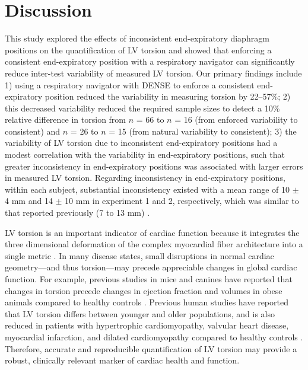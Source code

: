 \section{Discussion}
	This study explored the effects of inconsistent end-expiratory diaphragm positions on the quantification of LV torsion and showed that enforcing a consistent end-expiratory position with a respiratory navigator can significantly reduce inter-test variability of measured LV torsion. Our primary findings include 1) using a respiratory navigator with DENSE to enforce a consistent end-expiratory position reduced the variability in measuring torsion by 22–57\%; 2) this decreased variability reduced the required sample sizes to detect a 10\% relative difference in torsion from $n$ = 66 to $n$ = 16 (from enforced variability to consistent) and $n$ = 26 to $n$ = 15 (from natural variability to consistent); 3) the variability of LV torsion due to inconsistent end-expiratory positions had a modest correlation with the variability in end-expiratory positions, such that greater inconsistency in end-expiratory positions was associated with larger errors in measured LV torsion. Regarding inconsistency in end-expiratory positions, within each subject, substantial inconsistency existed with a mean range of 10 $\pm$ 4 mm and 14 $\pm$ 10 mm in experiment 1 and 2, respectively, which was similar to that reported previously (7 to 13 mm) \cite{Liu1993,Wang1995a,Taylor1997a,Holland1998c,Fischer2006a}.
	
	LV torsion is an important indicator of cardiac function because it integrates the three dimensional deformation of the complex myocardial fiber architecture into a single metric \cite{Russel2011b,Gotte2006a}. In many disease states, small disruptions in normal cardiac geometry---and thus torsion---may precede appreciable changes in global cardiac function. For example, previous studies in mice and canines have reported that changes in torsion precede changes in ejection fraction and volumes in obese animals compared to healthy controls \cite{Broussard2016a,Kramer2013c}. Previous human studies have reported that LV torsion differs between younger and older populations, and is also reduced in patients with hypertrophic cardiomyopathy, valvular heart disease, myocardial infarction, and dilated cardiomyopathy compared to healthy controls \cite{Gotte2006a,Phan2009a,Oxenham2003a,Young1994a,Setser2003a,Garot2002a}. Therefore, accurate and reproducible quantification of LV torsion may provide a robust, clinically relevant marker of cardiac health and function.
	
